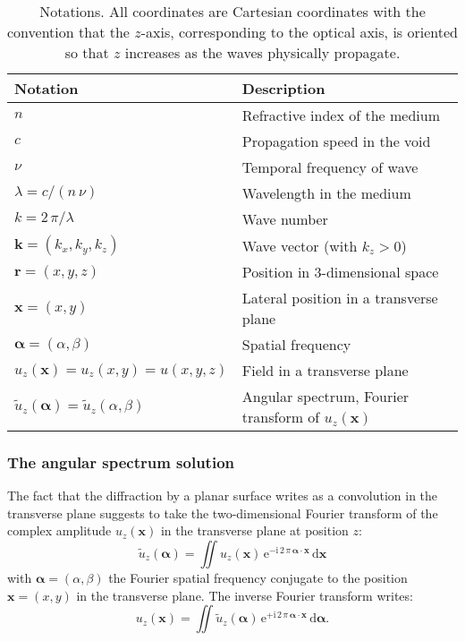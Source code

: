 \documentclass[a4paper]{article}
\newcommand{\V}[1]{\boldsymbol{#1}}
\newcommand*{\mathd}{\mathrm{d}}
\newcommand*{\mathe}{\mathrm{e}}
\newcommand*{\mathi}{\mathrm{i}}
\newcommand*{\FT}[1]{\widetilde{#1}}
\begin{document}
\begin{table}[t]
  \centering
  \begin{tabular}{ll}
    Notation & Description \\
    \hline
    $n$ & Refractive index of the medium\\
    $c$ & Propagation speed in the void\\
    $ν$ & Temporal frequency of wave\\
    $λ= c/(n\,ν)$ & Wavelength in the medium\\
    $k = 2\,π/λ$ & Wave number\\
    $\V{k} = (k_{x},k_{y},k_{z})$ & Wave vector (with $k_{z} > 0$)\\
    $\V{r} = (x,y,z)$ & Position in 3-dimensional space\\
    $\V{x} = (x,y)$ & Lateral position in a transverse plane\\
    $\V{α} = (α,β)$ & Spatial frequency\\
    $u_{z}(\V{x}) = u_{z}(x,y) = u(x,y,z)$ & Field in a transverse plane\\
    $\FT{u}_{z}(\V{α}) = \FT{u}_{z}(α,β)$
             & Angular spectrum, Fourier transform of $u_{z}(\V{x})$\\
  \end{tabular}
  \caption{Notations. All coordinates are Cartesian coordinates with the
    convention that the $z$-axis, corresponding to the optical axis, is
    oriented so that $z$ increases as the waves physically propagate.}
  \label{tab:notations}
\end{table}


\subsubsection{The angular spectrum solution}
\label{sec:angular-spectrum}

The fact that the diffraction by a planar surface writes as a convolution in
the transverse plane suggests to take the two-dimensional Fourier transform of
the complex amplitude $u_{z}(\V{x})$ in the transverse plane at position $z$:
\begin{equation}
  \label{eq:angular-spectrum}
  \FT{u}_{z}(\V{α}) = \iint u_{z}(\V{x})\,
  \mathe^{-\mathi\,2\,π\,\V{α}·\V{x}}\,
  \mathd\V{x}
\end{equation}
with $\V{α} = (α,β)$ the Fourier spatial frequency conjugate to the position
$\V{x} = (x,y)$ in the transverse plane. The inverse Fourier transform writes:
\begin{equation}
  \label{eq:angular-spectrum-inverse}
  u_{z}(\V{x}) = \iint \FT{u}_{z}(\V{α})\,
  \mathe^{+\mathi\,2\,π\,\V{α}·\V{x}}\,
  \mathd\V{α}.
\end{equation}
\end{document}
